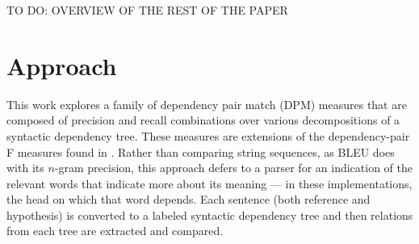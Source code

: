 \documentclass{kluwer}    %
\begin{document}
\begin{article}
TO DO: OVERVIEW OF THE REST OF THE PAPER



\section{Approach}
\label{sec:approach}

This work explores a family of dependency pair match (DPM) measures
that are composed of precision and recall combinations over various
decompositions of a syntactic dependency tree. These measures are
extensions of the dependency-pair F measures found in
\cite{roark06:sparseval,owczarzak07labelleddepseval}.  Rather than
comparing string sequences, as BLEU does with its $n$-gram precision,
this approach defers to a parser for an indication of the relevant
words that indicate more about its meaning --- in these
implementations, the head on which that word depends.  Each sentence
(both reference and hypothesis) is converted to a labeled syntactic
dependency tree and then relations from each tree are extracted and
compared.


\end{article}
\end{document}
